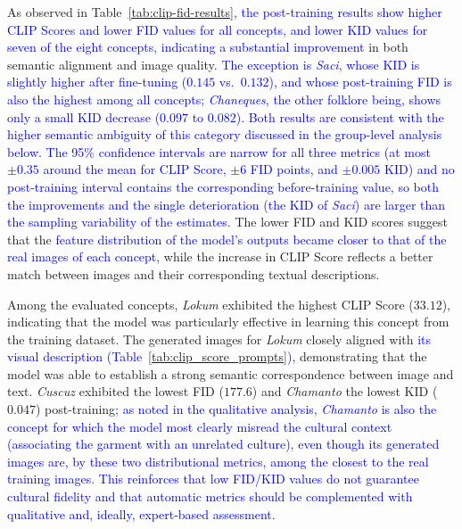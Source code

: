 \documentclass[pdflatex,sn-mathphys-num]{sn-jnl}%
\theoremstyle{thmstyleone}%
\theoremstyle{thmstyletwo}%
\theoremstyle{thmstylethree}%
\begin{document}
As observed in Table~\ref{tab:clip-fid-results}, \textcolor{blue}{the post-training results show higher CLIP Scores and lower FID values for all concepts, and lower KID values for seven of the eight concepts, indicating a substantial improvement} in both semantic alignment and image quality. \textcolor{blue}{The exception is \textit{Saci}, whose KID is slightly higher after fine-tuning ($0.145$ vs.\ $0.132$), and whose post-training FID is also the highest among all concepts; \textit{Chaneques}, the other folklore being, shows only a small KID decrease ($0.097$ to $0.082$). Both results are consistent with the higher semantic ambiguity of this category discussed in the group-level analysis below.} \textcolor{blue}{The 95\% confidence intervals are narrow for all three metrics (at most $\pm 0.35$ around the mean for CLIP Score, $\pm 6$ FID points, and $\pm 0.005$ KID) and no post-training interval contains the corresponding before-training value, so both the improvements and the single deterioration (the KID of \textit{Saci}) are larger than the sampling variability of the estimates.} The lower FID and KID scores suggest that the \textcolor{blue}{feature distribution of the model's outputs became closer to that of the real images of each concept}, while the increase in CLIP Score reflects a better match between images and their corresponding textual descriptions.




Among the evaluated concepts, \textit{Lokum} exhibited the highest CLIP Score ($33.12$), indicating that the model was particularly effective in learning this concept from the training dataset. The generated images for \textit{Lokum} closely aligned with \textcolor{blue}{its visual description (Table~\ref{tab:clip_score_prompts})}, demonstrating that the model was able to establish a strong semantic correspondence between image and text. \textit{Cuscuz} exhibited the lowest FID ($177.6$) and \textit{Chamanto} the lowest KID ($0.047$) post-training\textcolor{blue}{; as noted in the qualitative analysis, \textit{Chamanto} is also the concept for which the model most clearly misread the cultural context (associating the garment with an unrelated culture), even though its generated images are, by these two distributional metrics, among the closest to the real training images. This reinforces that low FID/KID values do not guarantee cultural fidelity and that automatic metrics should be complemented with qualitative and, ideally, expert-based assessment.}
\end{document}
